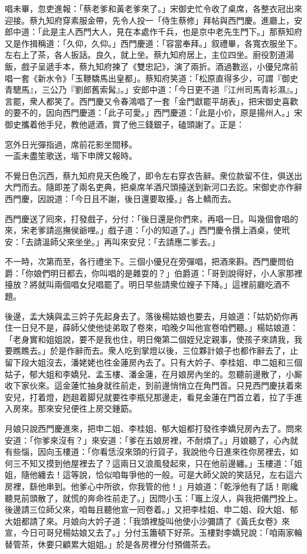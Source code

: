 唱未畢，忽吏進報：「蔡老爹和黃老爹來了。」宋御史忙令收了桌席，各整衣冠出來迎接。蔡九知府穿素服金帶，先令人投一「侍生蔡修」拜帖與西門慶。進廳上，安郎中道：「此是主人西門大人，見在本處作千兵，也是京中老先生門下。」那蔡知府又是作揖稱道：「久仰，久仰。」西門慶道：「容當奉拜。」叙禮畢，各寬衣服坐下。左右上了茶，各人扳話。良久，就上坐。蔡九知府居上，主位四坐。廚役割道湯飯，戲子呈遞手本，蔡九知府揀了《雙忠記》，{}演了兩折。酒過數巡，小優兒席前唱一套《新水令》「玉鞭驕馬出皇都」。蔡知府笑道：「松原直得多少，可謂『御史青驄馬』，三公乃『劉郎舊索髯』。」安郎中道：「今日更不道『江州司馬青衫濕』。」言罷，衆人都笑了。{}西門慶又令春鴻唱了一套「金門獻罷平胡表」，把宋御史喜歡的要不的，因向西門慶道：「此子可愛。」西門慶道：「此是小价，原是揚州人。」宋御史攜着他手兒，教他遞酒，賞了他三錢銀子，磕頭謝了。正是：

\begin{myquote}
窓外日光彈指過，席前花影坐間移。\\一盃未盡笙歌送，堦下申牌又報時。
\end{myquote}

不覺日色沉西，蔡九知府見天色晚了，即令左右穿衣告辭。衆位款留不住，俱送出大門而去。隨即差了兩名吏典，把桌席羊酒尺頭擡送到新河口去訖。宋御史亦作辭西門慶，因說道：「今日且不謝，後日還要取擾。」各上轎而去。

西門慶送了囘來，打發戲子，分付：「後日還是你們來，再唱一日。叫幾個會唱的來，宋老爹請巡撫侯爺哩。」戲子道：「小的知道了。」西門慶令攢上酒桌，使玳安：「去請溫師父來坐坐。」再叫來安兒：「去請應二爹去。」

不一時，次第而至，各行禮坐下。三個小優兒在旁彈唱，把酒來斟。西門慶問伯爵：「你娘們明日都去，你叫唱的是雜耍的？」伯爵道：「哥到說得好，小人家那裡擡放？將就叫兩個唱女兒唱罷了。明日早些請衆位嫂子下降。」這裡前廳吃酒不題。

後邊，孟大姨與孟三妗子先起身去了。落後楊姑娘也要去，月娘道：「姑奶奶你再住一日兒不是，薛師父使他徒弟取了卷來，咱晚夕叫他宣卷咱們聽。」楊姑娘道：「老身實和姐姐說，要不是我也住，明日俺第二個姪兒定親事，使孩子來請我，我要瞧瞧去。」於是作辭而去。衆人吃到掌燈以後，三位夥計娘子也都作辭去了，止留下段大姐沒去，潘姥姥也徃金蓮房內去了。只有大妗子、李桂姐、申二姐和三個姑子，郁大姐和李嬌兒、孟玉樓、潘金蓮，在月娘房內坐的。忽聽前邊散了，小厮收下家伙來。這金蓮忙抽身就徃前走，到前邊悄悄立在角門首。只見西門慶扶着來安兒，打着燈，趔趄着脚兒就要徃李瓶兒那邊走，看見金蓮在門首立着，拉了手進入房來。那來安兒便徃上房交鍾筯。

月娘只說西門慶進來，把申二姐、李桂姐、郁大姐都打發徃李嬌兒房內去了。問來安道：「你爹來沒有？」來安道：「爹在五娘房裡，不耐煩了。」月娘聽了，心內就有些惱，{}因向玉樓道：「你看恁沒來頭的行貨子，我說他今日進來徃你房裡去，如何三不知又摸到他屋裡去了？這兩日又浪風發起來，只在他前邊纏。」玉樓道：「姐姐，隨他纏去！這等說，恰似咱每爭他的一般。可是大師父說的笑話兒，左右這六房裡，繇他串到。他爹心中所欲，你我管的他！」月娘道：「乾淨他有了話！剛纔聽見前頭散了，就慌的奔命徃前走了。」因問小玉：「竈上沒人，與我把儀門拴上。後邊請三位師父來，咱每且聽他宣一囘卷着。」又把李桂姐、申二姐、段大姐、郁大姐都請了來。月娘向大妗子道：「我頭裡旋叫他使小沙彌請了《黃氏女卷》來宣，今日可哥兒楊姑娘又去了。」分付玉簫頓下好茶。玉樓對李嬌兒說：「咱兩家輪替管茶，休要只顧累大姐姐。」於是各房裡分付預備茶去。


